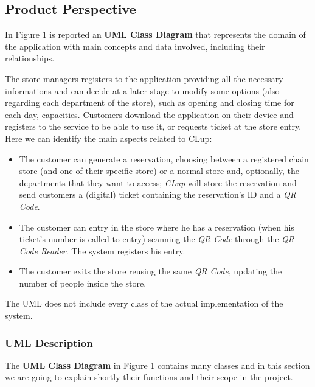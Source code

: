 \documentclass{article}
\begin{document}
	\subsection{Product Perspective}
	
	
	In Figure 1 is reported an {\bfseries UML Class Diagram} that represents the domain of the application with main concepts and data involved, including their relationships.
	
	The store managers registers to the application providing all the necessary informations and can decide at a later stage to modify some options (also regarding each department of the store), such as opening and closing time for each day, capacities. Customers download the application on their device and registers to the service to be able to use it, or requests ticket at the store entry. Here we can identify the main aspects related to CLup:
	
	\begin{itemize}
		
		\item The customer can generate a reservation, choosing between a registered chain store (and one of their specific store) or a normal store and, optionally, the departments that they want to access; \emph{CLup} will store the reservation and send customers a (digital) ticket containing the reservation's ID and a \emph{QR Code}.
		
		\item The customer can entry in the store where he has a reservation (when his ticket's number is called to entry) scanning the \emph{QR Code} through the \emph{QR Code Reader}. The system registers his entry.
		
		\item The customer exits the store reusing the same \emph{QR Code}, updating the number of people inside the store.
		
	\end{itemize}

	The UML does not include every class of the actual implementation of the system.
		
		\subsubsection{UML Description}
		
			The {\bfseries UML Class Diagram} in Figure 1 contains many classes and in this section we are going to explain shortly their functions and their scope in the project.
			
\end{document}
